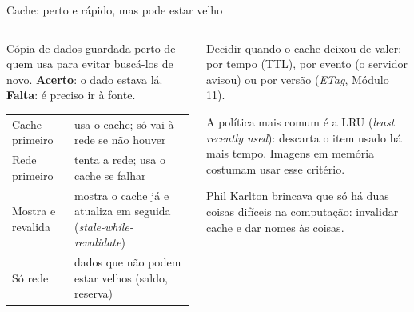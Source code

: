 \begin{frame}{Cache: perto e rápido, mas pode estar velho}
  \begin{columns}[T]
    \begin{column}{0.5\textwidth}
      \begin{definicao}[Cache]
        Cópia de dados guardada perto de quem usa para evitar buscá-los de novo. \textbf{Acerto}: o dado estava lá. \textbf{Falta}: é preciso ir à fonte.
      \end{definicao}
      \scriptsize
      \begin{tabularx}{\linewidth}{@{}l L@{}}
        \toprule
         &  \\
        \midrule
        Cache primeiro & usa o cache; só vai à rede se não houver \\
        Rede primeiro & tenta a rede; usa o cache se falhar \\
        Mostra e revalida & mostra o cache já e atualiza em seguida (\emph{stale-while-revalidate}) \\
        Só rede & dados que não podem estar velhos (saldo, reserva) \\
        \bottomrule
      \end{tabularx}
    \end{column}
    \begin{column}{0.48\textwidth}
      \begin{conceito}[Invalidação]
        Decidir quando o cache deixou de valer: por tempo (TTL), por evento (o servidor avisou) ou por versão (\emph{ETag}, Módulo 11).
      \end{conceito}
      \begin{pordentro}
        A política mais comum é a LRU (\emph{least recently used}): descarta o item usado há mais tempo. Imagens em memória costumam usar esse critério.
      \end{pordentro}
      \begin{historia}
        Phil Karlton brincava que só há duas coisas difíceis na computação: invalidar cache e dar nomes às coisas.
      \end{historia}
    \end{column}
  \end{columns}
\end{frame}

